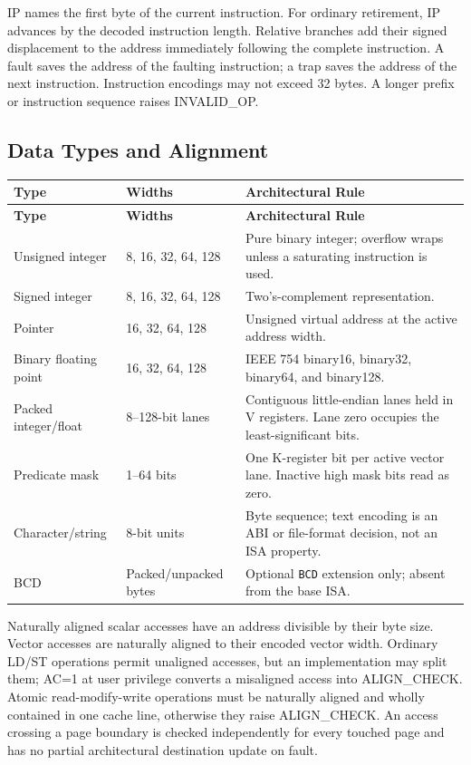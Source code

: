 \documentclass[11pt]{article}
\begin{document}
IP names the first byte of the current instruction. For ordinary retirement, IP advances by the decoded instruction length. Relative branches add their signed displacement to the address immediately following the complete instruction. A fault saves the address of the faulting instruction; a trap saves the address of the next instruction. Instruction encodings may not exceed 32 bytes. A longer prefix or instruction sequence raises INVALID\_OP.

\subsection{Data Types and Alignment}

\begin{longtable}{@{}L{2.8cm}L{2.7cm}L{6.4cm}@{}}
\toprule
\textbf{Type} & \textbf{Widths} & \textbf{Architectural Rule} \\ \midrule
\endfirsthead
\toprule
\textbf{Type} & \textbf{Widths} & \textbf{Architectural Rule} \\ \midrule
\endhead
Unsigned integer & 8, 16, 32, 64, 128 & Pure binary integer; overflow wraps unless a saturating instruction is used. \\
Signed integer & 8, 16, 32, 64, 128 & Two's-complement representation. \\
Pointer & 16, 32, 64, 128 & Unsigned virtual address at the active address width. \\
Binary floating point & 16, 32, 64, 128 & IEEE 754 binary16, binary32, binary64, and binary128. \\
Packed integer/float & 8--128-bit lanes & Contiguous little-endian lanes held in V registers. Lane zero occupies the least-significant bits. \\
Predicate mask & 1--64 bits & One K-register bit per active vector lane. Inactive high mask bits read as zero. \\
Character/string & 8-bit units & Byte sequence; text encoding is an ABI or file-format decision, not an ISA property. \\
BCD & Packed/unpacked bytes & Optional \texttt{BCD} extension only; absent from the base ISA. \\ \bottomrule
\end{longtable}

Naturally aligned scalar accesses have an address divisible by their byte size. Vector accesses are naturally aligned to their encoded vector width. Ordinary LD/ST operations permit unaligned accesses, but an implementation may split them; AC=1 at user privilege converts a misaligned access into ALIGN\_CHECK. Atomic read-modify-write operations must be naturally aligned and wholly contained in one cache line, otherwise they raise ALIGN\_CHECK. An access crossing a page boundary is checked independently for every touched page and has no partial architectural destination update on fault.
\end{document}
